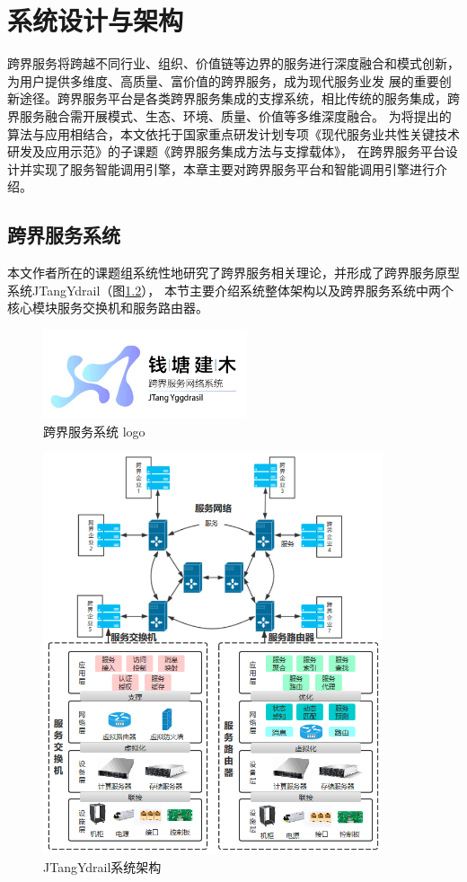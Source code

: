 \chapter{系统设计与架构}
跨界服务将跨越不同行业、组织、价值链等边界的服务进行深度融合和模式创新，为用户提供多维度、高质量、富价值的跨界服务，成为现代服务业发
展的重要创新途径。跨界服务平台是各类跨界服务集成的支撑系统，相比传统的服务集成，跨界服务融合需开展模式、生态、环境、质量、价值等多维深度融合。
为将提出的算法与应用相结合，本文依托于国家重点研发计划专项《现代服务业共性关键技术研发及应用示范》的子课题《跨界服务集成方法与支撑载体》，
在跨界服务平台设计并实现了服务智能调用引擎，本章主要对跨界服务平台和智能调用引擎进行介绍。

\section{跨界服务系统}
本文作者所在的课题组系统性地研究了跨界服务相关理论，并形成了跨界服务原型系统JTangYdrail（图\ref{fig:jianmu}），
本节主要介绍系统整体架构以及跨界服务系统中两个核心模块服务交换机和服务路由器。
\begin{figure}[htbp]
    \centering
    \includegraphics[width=6cm]{./images/jianmu.jpg}
    \caption{跨界服务系统 logo}
    \label{fig:jianmu}
  \end{figure}


  \begin{figure}[htbp]
    \centering
    \includegraphics[width=10cm]{./images/system.png}
    \caption{JTangYdrail系统架构}
    \label{fig:jianmu}
  \end{figure}


